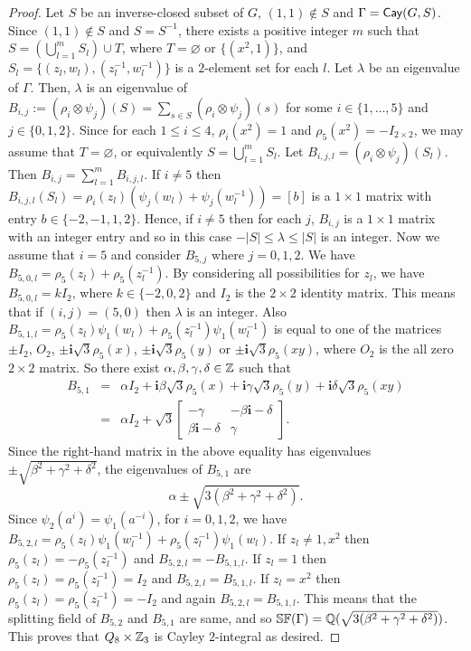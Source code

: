 \documentclass{amsart}
\def \leq {\leqslant}
\def\Cay{{\sf Cay}} \def\Ker{{\sf Ker}}
\begin{document}
\begin{proof}
	Let $S$ be an inverse-closed subset of $G$, $(1,1)\notin S$ and $\Gamma=\Cay(G,S)$. Since $(1,1)\notin S$ and $S=S^{-1}$, there exists a positive integer $m$ such that $S=(\bigcup_{l=1}^m S_l)\cup T$, where $T=\varnothing$ or $\{(x^2,1)\}$, and $S_l=\{(z_l,w_l),(z_l^{-1},w_l^{-1})\}$ is a $2$-element set for each $l$.  Let $\lambda$ be an eigenvalue of $\Gamma$. Then, $\lambda$ is an eigenvalue of $B_{i,j}:=(\rho_i\otimes\psi_j)(S)=\sum_{s\in S}(\rho_i\otimes\psi_j)(s)$ for some $i\in\{1,\ldots,5\}$ and $j\in\{0,1,2\}$. Since for each $1\leq i\leq 4$, $\rho_i(x^2)=1$ and $\rho_5(x^2)=-I_{2\times 2}$, we may assume that $T=\varnothing$, or equivalently $S=\bigcup_{l=1}^m S_l$. Let $B_{i,j,l}=(\rho_i\otimes\psi_j)(S_l)$. Then $B_{i,j}=\sum_{l=1}^mB_{i,j,l}$. If $i\neq 5$ then $B_{i,j,l}(S_l)=\rho_i(z_l)(\psi_j(w_l)+\psi_j(w_l^{-1}))=[b]$ is a $1\times 1$ matrix with entry $b\in\{-2,-1,1,2\}$. Hence, if $i\neq 5$ then for each $j$, $B_{i,j}$ is a $1\times 1$ matrix with an integer entry and so in this case $-|S|\leq \lambda\leq |S|$ is an integer. Now we assume that $i=5$ and consider $B_{5,j}$ where $j=0,1,2$. We have
	$B_{5,0,l}=\rho_5(z_l)+\rho_5(z_l^{-1})$. By considering all possibilities for $z_l$, we have $B_{5,0,l}=kI_2$, where $k\in\{-2,0,2\}$ and $I_2$ is the $2\times 2$ identity matrix. This means that if $(i,j)=(5,0)$ then $\lambda$ is an integer. Also $B_{5,1,l}=\rho_5(z_l)\psi_1(w_l)+\rho_5(z_l^{-1})\psi_1(w_l^{-1})$ is equal to one of the matrices $\pm I_2$, $O_2$, $\pm \textbf{i}\sqrt{3}\rho_5(x)$, $\pm \textbf{i}\sqrt{3}\rho_5(y)$ or $\pm \textbf{i}\sqrt{3}\rho_5(xy)$, where $O_2$ is the all zero $2\times 2$ matrix. So there exist $\alpha,\beta,\gamma,\delta\in\Bbb Z$ such that
	\begin{eqnarray*}
		B_{5,1}&=&\alpha I_2+\textbf{i}\beta\sqrt{3}\rho_5(x)+\textbf{i}\gamma\sqrt{3}\rho_5(y)+\textbf{i}\delta\sqrt{3}\rho_5(xy)\\
		&=&\alpha I_2+\sqrt{3}\begin{bmatrix}
			-\gamma&-\beta\textbf{i}-\delta\\
			\beta\textbf{i}-\delta&\gamma
		\end{bmatrix}.
	\end{eqnarray*}
	Since the right-hand matrix in the above equality has eigenvalues $\pm\sqrt{\beta^2+\gamma^2+\delta^2}$, the eigenvalues of $B_{5,1}$ are
	\[\alpha\pm \sqrt{3(\beta^2+\gamma^2+\delta^2)}.\] 
	Since $\psi_2(a^{i})=\psi_1(a^{-i})$, for $i=0,1,2$, we have $B_{5,2,l}=\rho_5(z_l)\psi_1(w_l^{-1})+\rho_5(z_l^{-1})\psi_1(w_l)$. If $z_l\neq 1,x^2$ then $\rho_5(z_l)=-\rho_5(z_l^{-1})$ and $B_{5,2,l}=-B_{5,1,l}$. If $z_l=1$ then $\rho_5(z_l)=\rho_5(z_l^{-1})=I_2$ and $B_{5,2,l}=B_{5,1,l}$. If $z_l=x^2$ then $\rho_5(z_l)=\rho_5(z_l^{-1})=-I_2$ and again $B_{5,2,l}=B_{5,1,l}$. This means that the splitting field of $B_{5,2}$ and $B_{5,1}$ are same, and so $\Bbb {SF}(\Gamma)=\Bbb Q(\sqrt{3(\beta^2+\gamma^2+\delta^2)})$. This proves that $Q_8\times\Bbb Z_3$ is Cayley $2$-integral as desired.
\end{proof}
\end{document}
